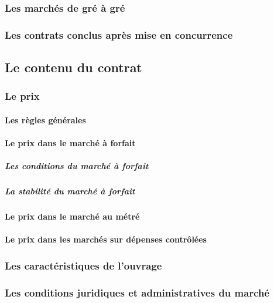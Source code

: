 			\subsubsection{Les marchés de gré à gré}
			
			\subsubsection{Les contrats conclus après mise en concurrence}
		
		\subsection{Le contenu du contrat}
		
			\subsubsection{Le prix}
			
				\paragraph{Les règles générales}
				
				\paragraph{Le prix dans le marché à forfait}
				
					\subparagraph{Les conditions du marché à forfait}
					
					\subparagraph{La stabilité du marché à forfait}
				
				\paragraph{Le prix dans le marché au métré}
				
				\paragraph{Le prix dans les marchés sur dépenses contrôlées}
			
			\subsubsection{Les caractéristiques de l'ouvrage}
			
			\subsubsection{Les conditions juridiques et administratives du marché}
			
